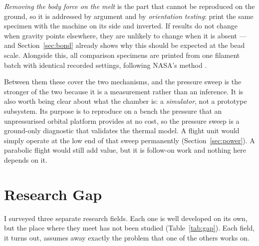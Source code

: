 \documentclass[11pt,a4paper]{article}
\begin{document}
\emph{Removing the body force on the melt} is the part that cannot be reproduced
on the ground, so it is addressed by argument and by \emph{orientation testing}:
print the same specimen with the machine on its side and inverted. If results do
not change when gravity points elsewhere, they are unlikely to change when it is
absent --- and Section~\ref{sec:bond} already shows why this should be expected
at the bead scale. Alongside this, all comparison specimens are printed from one
filament batch with identical recorded settings, following NASA's method
\cite{prater2019zerog}.

Between them these cover the two mechanisms, and the pressure sweep is the
stronger of the two because it is a measurement rather than an inference. It is
also worth being clear about what the chamber is: a \emph{simulator}, not a
prototype subsystem. Its purpose is to reproduce on a bench the pressure that an
unpressurised orbital platform provides at no cost, so the pressure sweep is a
ground-only diagnostic that validates the thermal model. A flight unit would
simply operate at the low end of that sweep permanently
(Section~\ref{sec:power}). A
parabolic flight would still add value, but it is follow-on work and nothing here
depends on it.

\section{Research Gap}

I surveyed three separate research fields. Each one is well developed on its own,
but the place where they meet has not been studied (Table~\ref{tab:gap}). Each
field, it turns out, assumes away exactly the problem that one of the others
works on.
\end{document}
